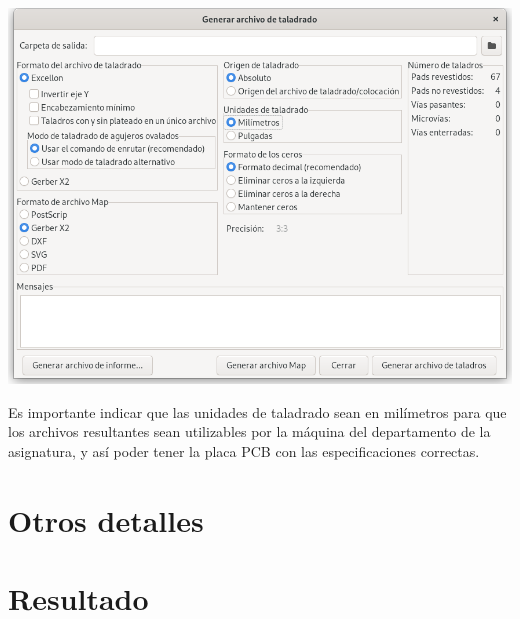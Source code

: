 \includegraphics[width=\linewidth]{gerber-drilling-file-generation.png}

Es importante indicar que las unidades de taladrado sean en milímetros para que
los archivos resultantes sean utilizables por la máquina del departamento de la
asignatura, y así poder tener la placa PCB con las especificaciones correctas.

\section{Otros detalles}



\section{Resultado}

